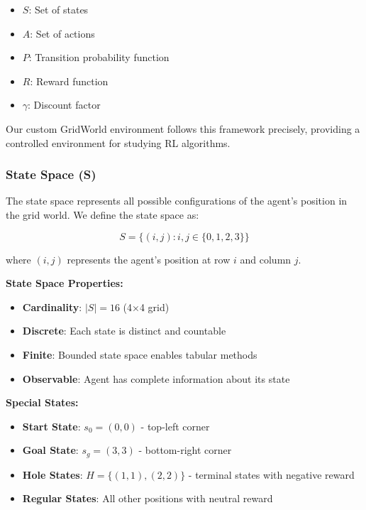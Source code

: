 \documentclass[12pt]{article}
\begin{document}
{{{\begin{itemize}
    \item $S$: Set of states
    \item $A$: Set of actions
    \item $P$: Transition probability function
    \item $R$: Reward function
    \item $\gamma$: Discount factor
\end{itemize}

Our custom GridWorld environment follows this framework precisely, providing a controlled environment for studying RL algorithms.

\subsubsection{State Space (S)}

The state space represents all possible configurations of the agent's position in the grid world. We define the state space as:

\begin{equation}
S = \{(i, j) : i, j \in \{0, 1, 2, 3\}\}
\end{equation}

where $(i, j)$ represents the agent's position at row $i$ and column $j$.

\textbf{State Space Properties:}
\begin{itemize}
    \item \textbf{Cardinality}: $|S| = 16$ (4×4 grid)
    \item \textbf{Discrete}: Each state is distinct and countable
    \item \textbf{Finite}: Bounded state space enables tabular methods
    \item \textbf{Observable}: Agent has complete information about its state
\end{itemize}

\textbf{Special States:}
\begin{itemize}
    \item \textbf{Start State}: $s_0 = (0, 0)$ - top-left corner
    \item \textbf{Goal State}: $s_g = (3, 3)$ - bottom-right corner
    \item \textbf{Hole States}: $H = \{(1, 1), (2, 2)\}$ - terminal states with negative reward
    \item \textbf{Regular States}: All other positions with neutral reward
\end{itemize}

}}}
\end{document}
